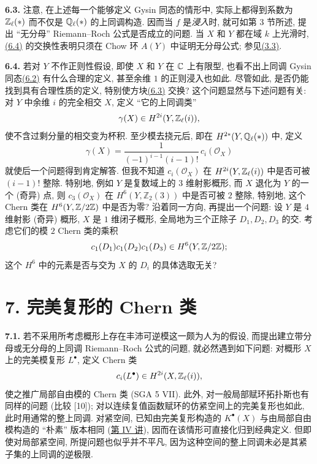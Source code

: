 \noindent{}\textbf{6.3.}
注意, 在上述每一个能够定义 Gysin 同态的情形中, 实际上都得到系数为 $\mathbb Z_\ell(*)$ 而不仅是 $\mathbb Q_\ell(*)$ 的上同调构造. 因而当 $f$ 是\emph{浸入}时, 就可如第 3 节所述, 提出 ``无分母'' Riemann--Roch 公式是否成立的问题. 当 $X$ 和 $Y$ 都在域 $k$ 上光滑时, \hyperlink{sga6.e14.eq.6-4}{(6.4)} 的交换性表明只须在 Chow 环 $A(Y)$ 中证明无分母公式; 参见\hyperlink{sga6.e14.para.3-3}{(3.3)}.

\noindent{}\textbf{6.4.}
若对 $Y$ 不作正则性假设, 即使 $X$ 和 $Y$ 在 $\mathbb C$ 上有限型, 也看不出上同调 Gysin 同态\hyperlink{sga6.e14.eq.6-2}{(6.2)} 有什么合理的定义, 甚至余维 $1$ 的正则浸入也如此. 尽管如此, 是否仍能找到具有合理性质的定义, 特别使方块\hyperlink{sga6.e14.eq.6-3}{(6.3)} 交换? 这个问题显然与下述问题有关: 对 $Y$ 中余维 $i$ 的完全相交 $X$, 定义 ``它的上同调类''
\[
 \gamma(X)\in H^{2i}(Y,\mathbb Z_\ell(i)),
\]
使不含过剩分量的相交变为杯积. 至少模去挠元后, 即在 $H^{2*}(Y,\mathbb Q_\ell(*))$ 中, 定义
\[
 \gamma(X)=\frac{1}{(-1)^{i-1}(i-1)!}\,c_i(\mathcal O_X)
\]
就使后一个问题得到肯定解答. 但我不知道 $c_i(\mathcal O_X)$ 在 $H^{2i}(Y,\mathbb Z_\ell(i))$ 中是否可被 $(i-1)!$ 整除. 特别地, 例如 $Y$ 是复数域上的 $3$ 维射影概形, 而 $X$ 退化为 $Y$ 的一个 (奇异) 点, 则 $c_3(\mathcal O_X)$ 在 $H^6(Y,\mathbb Z_2(3))$ 中是否可被 $2$ 整除, 特别地, 这个 Chern 类在 $H^6(Y,\mathbb Z/2\mathbb Z)$ 中是否为零? 沿着同一方向, 再提出一个问题: 设 $Y$ 是 $4$ 维射影 (奇异) 概形, $X$ 是 $1$ 维闭子概形, 全局地为三个正除子 $D_1,D_2,D_3$ 的交. 考虑它们的模 $2$ Chern 类的乘积
\[
 c_1(D_1)c_1(D_2)c_1(D_3)\in H^6(Y,\mathbb Z/2\mathbb Z);
\]
这个 $H^6$ 中的元素是否与交为 $X$ 的 $D_i$ 的具体选取无关?

\section*{7. 完美复形的 Chern 类}

\noindent{}\textbf{7.1.}
若不采用所考虑概形上存在丰沛可逆模这一颇为人为的假设, 而提出建立带分母或无分母的上同调 Riemann--Roch 公式的问题, 就必然遇到如下问题: 对概形 $X$ 上的完美模复形 $L^\bullet$, 定义 Chern 类
\[
 c_i(L^\bullet)\in H^{2i}(X,\mathbb Z_\ell(i)),
\]
使之推广局部自由模的 Chern 类 (SGA 5 VII). 此外, 对一般局部赋环拓扑斯也有同样的问题 (比较 [10]); 对以连续复值函数赋环的仿紧空间上的完美复形也如此, 此时用通常的整上同调. 对紧空间, 已知由完美复形构造的 $K^\bullet(X)$ 与由局部自由模构造的 ``朴素'' 版本相同 (\hyperlink{sga6.e04.expose}{第 IV 讲}), 因而在该情形可直接化归到经典定义. 但即使对局部紧空间, 所提问题也似乎并不平凡, 因为这种空间的整上同调未必是其紧子集的上同调的逆极限.

